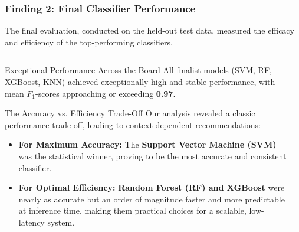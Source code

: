 \documentclass[aspectratio=169,10pt]{beamer}
\begin{document}
\begin{frame}
    \frametitle{Finding 2: Final Classifier Performance}
    \fontsize{9}{9}\selectfont
    
    The final evaluation, conducted on the held-out test data, measured the efficacy and efficiency of the top-performing classifiers.
    
    \begin{columns}[T]
        \begin{column}{0.5\textwidth}
            \begin{block}{Exceptional Performance Across the Board}
                All finalist models (SVM, RF, XGBoost, KNN) achieved exceptionally high and stable performance, with mean \(F_1\)-scores approaching or exceeding \textbf{0.97}.
            \end{block}

            \begin{alertblock}{The Accuracy vs. Efficiency Trade-Off}
                Our analysis revealed a classic performance trade-off, leading to context-dependent recommendations:
                \begin{itemize}
                    \item \textbf{For Maximum Accuracy:} The \textbf{Support Vector Machine (SVM)} was the statistical winner, proving to be the most accurate and consistent classifier.
                    
                    \item \textbf{For Optimal Efficiency:} \textbf{Random Forest (RF) and XGBoost} were nearly as accurate but an order of magnitude faster and more predictable at inference time, making them practical choices for a scalable, low-latency system.
                \end{itemize}
            \end{alertblock}
        \end{column}
        
        \begin{column}{0.45\textwidth}
            

\end{column}
\end{columns}
\end{frame}
\end{document}
